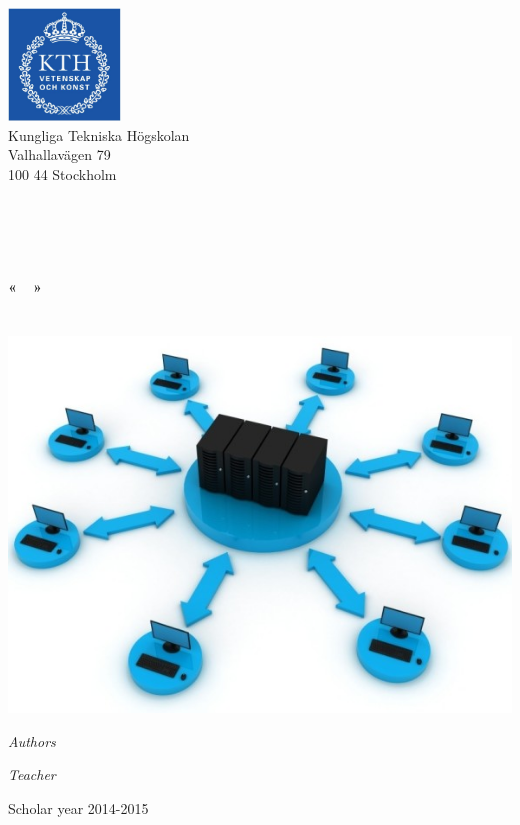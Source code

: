 \begin{center}
	\begin{minipage}[t]{0.48\textwidth}
	  \begin{flushleft}
	    \includegraphics [width=30mm]{img/logo_kth.jpg} \\[0.1cm]
		Kungliga Tekniska Högskolan\\
		Valhallavägen 79\\
		100 44 Stockholm
	  \end{flushleft}
	\end{minipage}
	\begin{minipage}[t]{0.48\textwidth}
	  \begin{flushright}
	  \end{flushright}
	\end{minipage} \\[1cm]

	\textsc{\Large \reportsubject}\\[0.3cm]
	\HRule \\[0.4cm]
	{\Huge \bfseries \reporttitle}\\[0.3cm]
	{\LARGE \bfseries «~\stagetopic~»}\\[0.3cm]
	{\Large \dateperiod}\\[0.4cm]
	\HRule \\[1.5cm]

	\includegraphics [width=0.55\linewidth]{img/icon.jpg} \\[1.5cm]
	\begin{minipage}[t]{0.5\textwidth}
	  \begin{flushleft} \large
	    \emph{Authors}\\
	    \reportauthor
	  \end{flushleft}
	\end{minipage}
	\begin{minipage}[t]{0.4\textwidth}
	  \begin{flushright} \large
	    \emph{Teacher} \\
	    \enseignants
	  \end{flushright}
	\end{minipage}

	\vfill
	\footnotesize{Scholar year 2014-2015}
\end{center}
